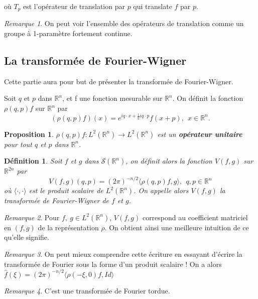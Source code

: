 \documentclass[a4paper, 12pt]{report}
\newcommand{\R}{\mathbb{R}} %
\newcommand{\ra}[1][]{\overset{#1}{\rightarrow}} %
\renewcommand{\.}{\cdot} %
\theoremstyle{break}
\newtheorem{definition}{Définition}
\newtheorem{proposition}{Proposition}
\theoremstyle{remark}
\newtheorem{remark}{Remarque}
\theoremstyle{proofstyle}
\begin{document}
où $T_p$ est l'opérateur de translation par $p$ qui translate $f$ par $p$.

\begin{remark}
    On peut voir l'ensemble des opérateurs de translation comme un groupe à 1-paramètre fortement continue.
\end{remark}

\subsection{La transformée de Fourier-Wigner}

Cette partie aura pour but de présenter la transformée de Fourier-Wigner.

Soit $q$ et $p$ dans $\R^n$, et f une fonction mesurable sur $\R^n$. On définit la fonction $\rho (q,p) f$ sur $\R^n$ par
$$(\rho(q,p)f)(x) = e^{iq\.x + \frac{1}{2} iq \.p}f(x+p), ~~x\in\R^n.$$

\begin{proposition}
    $\rho(q,p)f : L^2(\R^n) \ra L^2(\R^n)$ est un \textbf{opérateur unitaire} pour tout $q$ et $p$ dans $\R^n$.
\end{proposition}


\begin{definition}
    Soit $f$ et $g$ dans $\mathcal{S}(\R^n)$, on définit alors la fonction $V(f,g)$ sur $\R^{2n}$ par
    $$V(f,g)(q,p) = (2 \pi)^{-n/2} \langle \rho (q,p)f,g \rangle, ~~q,p \in \R^n$$
    où $\langle \., \. \rangle$ est le produit scalaire de $L^2(\R^n)$.
    On appelle alors $V(f,g)$ la transformée de Fourier-Wigner de $f$ et $g$.
\end{definition}

\begin{remark}
    Pour $f, ~ g \in L^2(\R^n)$, $V(f,g)$ correspond au coefficient matriciel en $(f,g)$ de la représentation $\rho$. On obtient ainsi une meilleure intuition de ce qu'elle signifie.
\end{remark}
\begin{remark}
    On peut mieux comprendre cette écriture en essayant d'écrire la transformée de Fourier sous la forme d'un produit scalaire !
    On a alors $\hat{f} (\xi) = (2 \pi)^{-n/2} \langle \rho(-\xi,0)f, Id \rangle$
\end{remark}

\begin{remark}
    C'est une transformée de Fourier tordue.
\end{remark}\vspace{5pt}
\end{document}
